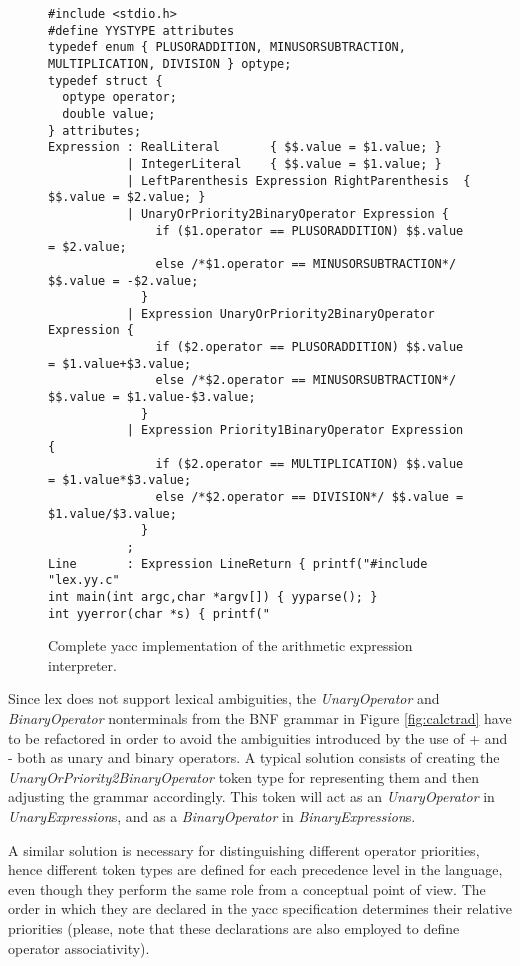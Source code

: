 \documentclass[preprint]{elsarticle}
\begin{document}
\begin{figure*}[tb!]
\begin{verbatim}
#include <stdio.h>
#define YYSTYPE attributes
typedef enum { PLUSORADDITION, MINUSORSUBTRACTION, MULTIPLICATION, DIVISION } optype;
typedef struct {
  optype operator;
  double value;
} attributes;
Expression : RealLiteral       { $$.value = $1.value; }
           | IntegerLiteral    { $$.value = $1.value; }
           | LeftParenthesis Expression RightParenthesis  { $$.value = $2.value; }
           | UnaryOrPriority2BinaryOperator Expression {
               if ($1.operator == PLUSORADDITION) $$.value = $2.value;
               else /*$1.operator == MINUSORSUBTRACTION*/ $$.value = -$2.value;
             }
           | Expression UnaryOrPriority2BinaryOperator Expression {
               if ($2.operator == PLUSORADDITION) $$.value = $1.value+$3.value;
               else /*$2.operator == MINUSORSUBTRACTION*/ $$.value = $1.value-$3.value;
             }
           | Expression Priority1BinaryOperator Expression {
               if ($2.operator == MULTIPLICATION) $$.value = $1.value*$3.value;
               else /*$2.operator == DIVISION*/ $$.value = $1.value/$3.value;
             }
           ;
Line       : Expression LineReturn { printf("#include "lex.yy.c"
int main(int argc,char *argv[]) { yyparse(); }
int yyerror(char *s) { printf("\end{verbatim}
\caption{Complete yacc implementation of the arithmetic expression interpreter.} \label{fig:calcimyacc}
\end{figure*}

Since lex does not support lexical ambiguities, the \emph{UnaryOperator} and \emph{BinaryOperator} nonterminals from the BNF grammar in Figure \ref{fig:calctrad} have to be refactored in order to avoid the ambiguities introduced by the use of + and - both as unary and binary operators.
A typical solution consists of creating the \emph{UnaryOrPriority2BinaryOperator} token type for representing them and then adjusting the grammar accordingly.
This token will act as an \emph{UnaryOperator} in \emph{UnaryExpression}s, and as a \emph{BinaryOperator} in \emph{BinaryExpression}s.

A similar solution is necessary for distinguishing different operator priorities, hence different token types are defined for each precedence level in the language, even though they perform the same role from a conceptual point of view.
The order in which they are declared in the yacc specification determines their relative priorities (please, note that these declarations are also employed to define operator associativity).
\end{document}
